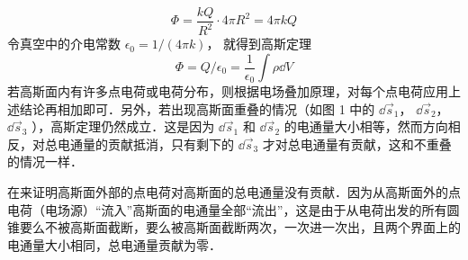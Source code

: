 \begin{enumerate}
\begin{equation}
\Phi  = \frac{kQ}{R^2} \cdot 4\pi R^2 = 4\pi kQ
\end{equation} 
令真空中的介电常数 $\epsilon_0 = 1/(4\pi k)$， 就得到高斯定理
\begin{equation}
\Phi  = Q/\epsilon_0 = \frac{1}{\epsilon_0} \int \rho \dd{V}
\end{equation} 
若高斯面内有许多点电荷或电荷分布，则根据电场叠加原理，对每个点电荷应用上述结论再相加即可．另外，若出现高斯面重叠的情况（如图 1 中的 $\dd{\vec s_1}$，  $\dd{\vec s_2}$，  $\dd{\vec s_3}$ ），高斯定理仍然成立．这是因为 $\dd{\vec s_1}$ 和 $\dd{\vec s_2}$ 的电通量大小相等，然而方向相反，对总电通量的贡献抵消，只有剩下的 $\dd{\vec s_3}$ 才对总电通量有贡献，这和不重叠的情况一样．

在来证明高斯面外部的点电荷对高斯面的总电通量没有贡献．因为从高斯面外的点电荷（电场源）“流入”高斯面的电通量全部“流出”，这是由于从电荷出发的所有圆锥要么不被高斯面截断，要么被高斯面截断两次，一次进一次出，且两个界面上的电通量大小相同，总电通量贡献为零．
\end{enumerate}
 
 
 
 
 
 
 
 
 